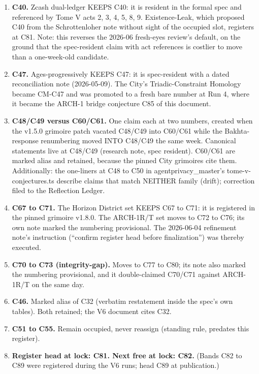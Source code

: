 \documentclass[
]{article}
\providecommand{\tightlist}{%
  \setlength{\itemsep}{0pt}\setlength{\parskip}{0pt}}
\begin{document}
\begin{enumerate}
\def\labelenumi{\arabic{enumi}.}
\tightlist
\item
  \textbf{C40.} Zcash dual-ledger KEEPS C40: it is resident in the
  formal spec and referenced by Tome V acts 2, 3, 4, 5, 8, 9.
  Existence-Leak, which proposed C40 from the Schrottenloher note
  without sight of the occupied slot, registers at C81. Note: this
  reverses the 2026-06 fresh-eyes review's default, on the ground that
  the spec-resident claim with act references is costlier to move than a
  one-week-old candidate.
\item
  \textbf{C47.} Ages-progressively KEEPS C47: it is spec-resident with a
  dated reconciliation note (2026-05-09). The City's Triadic-Constraint
  Homology became CM-C47 and was promoted to a fresh bare number at Run
  4, where it became the ARCH-1 bridge conjecture C85 of this document.
\item
  \textbf{C48/C49 versus C60/C61.} One claim each at two numbers,
  created when the v1.5.0 grimoire patch vacated C48/C49 into C60/C61
  while the Bakhta-response renumbering moved INTO C48/C49 the same
  week. Canonical statements live at C48/C49 (research note, spec
  resident). C60/C61 are marked alias and retained, because the pinned
  City grimoires cite them. Additionally: the one-liners at C48 to C50
  in agentprivacy\_master's tome-v-conjectures.ts describe claims that
  match NEITHER family (drift); correction filed to the Reflection
  Ledger.
\item
  \textbf{C67 to C71.} The Horizon District set KEEPS C67 to C71: it is
  registered in the pinned grimoire v1.8.0. The ARCH-1R/T set moves to
  C72 to C76; its own note marked the numbering provisional. The
  2026-06-04 refinement note's instruction (``confirm register head
  before finalization'') was thereby executed.
\item
  \textbf{C70 to C73 (integrity-gap).} Moves to C77 to C80; its note
  also marked the numbering provisional, and it double-claimed C70/C71
  against ARCH-1R/T on the same day.
\item
  \textbf{C46.} Marked alias of C32 (verbatim restatement inside the
  spec's own tables). Both retained; the V6 document cites C32.
\item
  \textbf{C51 to C55.} Remain occupied, never reassign (standing rule,
  predates this register).
\item
  \textbf{Register head at lock: C81. Next free at lock: C82.} (Bands
  C82 to C89 were registered during the V6 runs; head C89 at
  publication.)
\end{enumerate}
\end{document}

